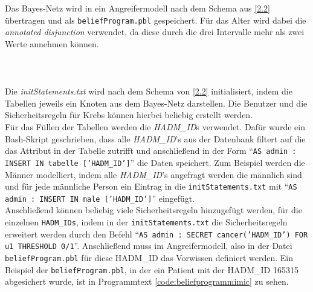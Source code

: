\documentclass[german,version-2020-11]{uzl-thesis}
\begin{document}
\begin{figure}[ht]
\end{figure}Das Bayes-Netz wird in ein Angreifermodell nach dem Schema aus \ref{2.2} übertragen und als \texttt{beliefProgram.pbl} gespeichert. Für das Alter wird dabei die \textit{annotated disjunction} verwendet, da diese durch die drei Intervalle mehr als zwei Werte annehmen können. \\ \\ \\ \\
Die \textit{initStatements.txt} wird nach dem Schema von \ref{2.2} initialisiert, indem die Tabellen jeweils ein Knoten aus dem Bayes-Netz darstellen. Die Benutzer und die Sicherheitsregeln für Krebs können hierbei beliebig erstellt werden.\\  Für das Füllen der Tabellen werden die \textit{HADM\_ID}s verwendet. Dafür wurde ein Bash-Skript geschrieben, dass alle \textit{HADM\_ID}'s  aus der Datenbank filtert auf die das Attribut in der Tabelle zutrifft und anschließend in der Form \enquote{\texttt{AS admin : INSERT IN tabelle ['HADM\_ID']}} die Daten speichert. Zum Beispiel werden die Männer modelliert, indem alle \textit{HADM\_ID}'s angefragt werden die männlich sind und für jede männliche Person ein Eintrag in die \texttt{initStatements.txt} mit \enquote{\texttt{AS admin : INSERT IN male ['HADM\_ID']}} eingefügt. \\ 
Anschließend können beliebig viele Sicherheitsregeln hinzugefügt werden, für die einzelnen \texttt{HADM\_IDs}, indem in der \texttt{initStatements.txt} die Sicherheitsregeln erweitert werden durch den Befehl \enquote{\texttt{AS admin : SECRET cancer('HADM\_ID') FOR u1 THRESHOLD 0/1}}. Anschließend muss im Angreifermodell, also in der Datei \texttt{beliefProgram.pbl} für diese HADM\_ID das Vorwissen definiert werden. Ein Beispiel der \texttt{beliefProgram.pbl}, in der ein Patient mit der HADM\_ID 165315 abgesichert wurde, ist in Programmtext  \ref{code:beliefprogrammimic} zu sehen. \\
\end{document}
